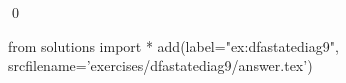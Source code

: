 
\begin{ex} 
  \label{ex:dfastatediag9}
  
  \qed
\end{ex} 
\begin{python0}
from solutions import *
add(label="ex:dfastatediag9",
    srcfilename='exercises/dfastatediag9/answer.tex') 
\end{python0}
